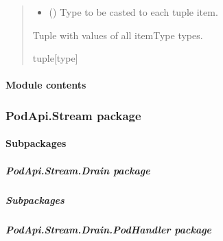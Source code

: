 \documentclass[letterpaper,10pt,english]{sphinxmanual}
\begin{document}
\begin{fulllineitems}
\begin{fulllineitems}
\begin{quote}
\begin{description}
\begin{itemize}
\item {} 
\sphinxAtStartPar
{} () \textendash{} Type to be casted to each tuple item.

\end{itemize}

\sphinxAtStartPar
Tuple with values of all itemType types.

\sphinxAtStartPar
tuple{[}type{]}

\end{description}\end{quote}

\end{fulllineitems}


\end{fulllineitems}



\paragraph{Module contents}
\label{\detokenize{PodApi.Parameters:module-PodApi.Parameters}}\label{\detokenize{PodApi.Parameters:module-contents}}
\sphinxstepscope


\subsubsection{PodApi.Stream package}
\label{\detokenize{PodApi.Stream:podapi-stream-package}}\label{\detokenize{PodApi.Stream::doc}}

\paragraph{Subpackages}
\label{\detokenize{PodApi.Stream:subpackages}}
\sphinxstepscope


\subparagraph{PodApi.Stream.Drain package}
\label{\detokenize{PodApi.Stream.Drain:podapi-stream-drain-package}}\label{\detokenize{PodApi.Stream.Drain::doc}}

\subparagraph{Subpackages}
\label{\detokenize{PodApi.Stream.Drain:subpackages}}
\sphinxstepscope


\subparagraph{PodApi.Stream.Drain.PodHandler package}
\label{\detokenize{PodApi.Stream.Drain.PodHandler:podapi-stream-drain-podhandler-package}}\label{\detokenize{PodApi.Stream.Drain.PodHandler::doc}}
\end{document}
